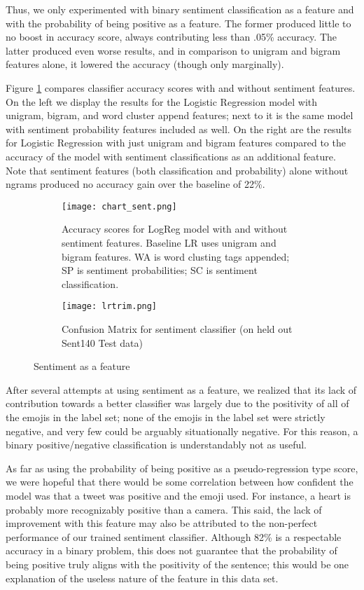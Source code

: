 \documentclass[11pt]{article}
\begin{document}
Thus, we only experimented with binary sentiment classification as a feature and with the probability of being positive as a feature. The former produced little to no boost in accuracy score, always contributing less than .05\% accuracy. The latter produced even worse results, and in comparison to unigram and bigram features alone, it lowered the accuracy (though only marginally).

Figure \ref{fig:sent} compares classifier accuracy scores with and without sentiment features. On the left we display the results for the Logistic Regression model with unigram, bigram, and word cluster append features; next to it is the same model with sentiment probability features included as well. On the right are the results for Logistic Regression with just unigram and bigram features compared to the accuracy of the model with sentiment classifications as an additional feature. Note that sentiment features (both classification and probability) alone without ngrams produced no accuracy gain over the baseline of 22\%.

\begin{figure}
\centering
\begin{subfigure}[t]{.59\textwidth}
  \centering
  \texttt{[image: chart\_sent.png]}
  \caption{Accuracy scores for LogReg model with and without sentiment features. Baseline LR uses unigram and bigram features. WA is word clusting tags appended; SP is sentiment probabilities; SC is sentiment classification.}
  \label{fig:sent}
\end{subfigure}\hfill
\begin{subfigure}[t]{.39\textwidth}
  \centering
  \texttt{[image: lrtrim.png]}
  \caption{Confusion Matrix for sentiment classifier (on held out Sent140 Test data)}
  \label{fig:conf_sent}
\end{subfigure}
\caption{Sentiment as a feature}
\label{fig:sentresults}
\end{figure}

After several attempts at using sentiment as a feature, we realized that its lack of contribution towards a better classifier was largely due to the positivity of all of the emojis in the label set; none of the emojis in the label set were strictly negative, and very few could be arguably situationally negative. For this reason, a binary positive/negative classification is understandably not as useful.

As far as using the probability of being positive as a pseudo-regression type score, we were hopeful that there would be some correlation between how confident the model was that a tweet was positive and the emoji used. For instance, a heart is probably more recognizably positive than a camera. This said, the lack of improvement with this feature may also be attributed to the non-perfect performance of our trained sentiment classifier. Although 82\% is a respectable accuracy in a binary problem, this does not guarantee that the probability of being positive truly aligns with the positivity of the sentence; this would be one explanation of the useless nature of the feature in this data set.
\end{document}
